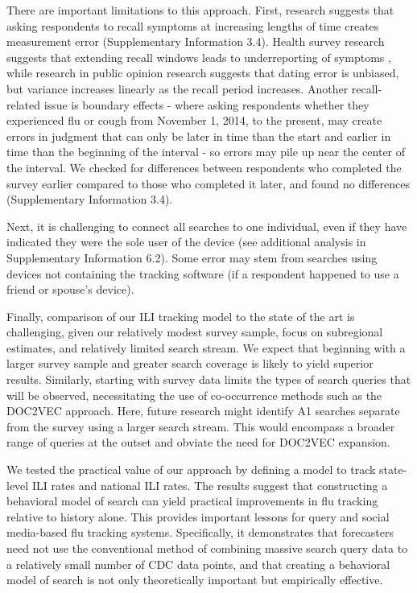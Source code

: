 \documentclass[fleqn,10pt]{wlscirep}
\begin{document}
There are important limitations to this approach. First, research suggests that asking respondents to recall symptoms at increasing lengths of time creates measurement error (Supplementary Information 3.4)\cite{rubin1989telescoping, boerma1991accuracy, arnold2013optimal, overbey2019comparison}. Health survey research suggests that extending recall windows leads to underreporting of symptoms \cite{boerma1991accuracy, arnold2013optimal}, while research in public opinion research suggests that dating error is unbiased, but variance increases linearly as the recall period increases. Another recall-related issue is boundary effects - where asking respondents whether they experienced flu or cough from November 1, 2014, to the present, may create errors in judgment that can only be later in time than the start and earlier in time than the beginning of the interval - so errors may pile up near the center of the interval. We checked for differences between respondents who completed the survey earlier compared to those who completed it later, and found no differences (Supplementary Information 3.4). 

Next, it is challenging to connect all searches to one individual, even if they have indicated they were the sole user of the device (see additional analysis in Supplementary Information 6.2). Some error may stem from searches using devices not containing the tracking software (if a respondent happened to use a friend or spouse's device). 

Finally, comparison of our ILI tracking model to the state of the art is challenging, given our relatively modest survey sample, focus on subregional estimates, and relatively limited search stream. We expect that beginning with a larger survey sample and greater search coverage is likely to yield superior results. Similarly, starting with survey data limits the types of search queries that will be observed, necessitating the use of co-occurrence methods such as the DOC2VEC approach. Here, future research might identify A1 searches separate from the survey using a larger search stream. This would encompass a broader range of queries at the outset and obviate the need for DOC2VEC expansion. 

We tested the practical value of our approach by defining a model to track state-level ILI rates and national ILI rates. The results suggest that constructing a behavioral model of search can yield practical improvements in flu tracking relative to history alone. This provides important lessons for query and social media-based flu tracking systems. Specifically, it demonstrates that forecasters need not use the conventional method of combining massive search query data to a relatively small number of CDC data points, and that creating a behavioral model of search is not only theoretically important but empirically effective.  
\end{document}
